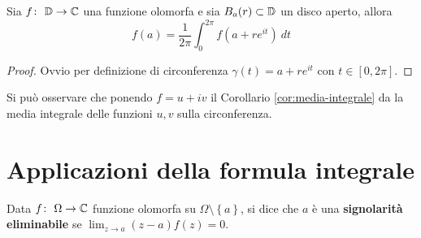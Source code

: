 \begin{corollary}
    Sia $f \colon\ \mathbb{D} \rightarrow \mathbb{C}$ una funzione olomorfa e sia $B_a(r) \subset
    \mathbb{D}$ un disco aperto, allora
    \begin{equation*}
        f(a) = \frac{1}{2\pi} \int_0^{2\pi} f(a + re^{it}) \ dt 
    \end{equation*}
    \label{cor:media-integrale}
\end{corollary}
\begin{proof}
  Ovvio per definizione di circonferenza $\gamma(t) = a + re^{it}$ con $t \in
    \left[ 0, 2\pi \right]$. 
\end{proof}
\begin{remark}
    Si può osservare che ponendo $f = u + iv$ il Corollario
    \ref{cor:media-integrale} da la media integrale delle funzioni $u, v$
    sulla circonferenza.
\end{remark}

\section{Applicazioni della formula integrale}

\begin{definition}
  Data $f \colon\ \Omega \rightarrow \mathbb{C}$ funzione olomorfa su $\Omega \setminus
  \left\{ a \right\}$, si dice che $a$ è una \textbf{signolarità
  eliminabile} se $\lim_{z\to a} (z-a) f(z) = 0$.
\end{definition}

